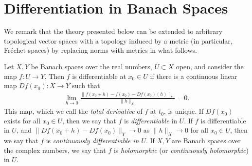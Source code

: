 \section{Differentiation in Banach Spaces}
We remark that the theory presented below can be extended to arbitrary
topological vector spaces with a topology induced by a metric (in particular,
Fr\'echet spaces) by replacing norms with metrics in what follows.
\begin{definition}
	\label{def:diff}
	Let $X,Y$ be Banach spaces over the real numbers, $U \subset X$ open,
  and consider the map $f: U \to Y$.
	Then $f$ is differentiable at $x_0 \in U$ if there
	is a continuous linear map $Df(x_0): X \to Y$ such that
	\begin{equation}
		\label{diff-limit}
		\begin{split}
			\lim_{h \to 0} \frac{\|f(x_0+ h) - f(x_0) -
			Df(x_0)(h) \|_Y}{\|h\|_{X}} = 0.
		\end{split}
	\end{equation}
	This map, which we call the \emph{total derivative} of $f$ at $t_0$, is 
	unique. If $Df(x_0)$ exists for all $x_0 \in U$,
	then we say that $f$ is
	\emph{differentiable} in $U$. If $f$ is differentiable in $U$, and 
	$\|Df(x_0 + h) - Df(x_0) \|_Y \to 0$ as $\|h\|_{X} \to 0$ for all $x_0 \in U$,
	then we say that $f$ is \emph{continuously differentiable in $U$}. If $X, Y$
  are Banach spaces over the complex numbers, we say that $f$ is
  \emph{holomorphic} (or \emph{continuously holomorphic}) in $U$.
\end{definition}

